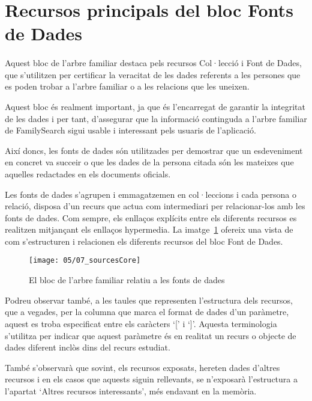\section{Recursos principals del bloc Fonts de Dades}

    \paragraph{}
    Aquest bloc de l'arbre familiar destaca pels recursos Col·lecció i Font de Dades, que s'utilitzen per certificar la veracitat de les dades referents a les persones que es poden trobar a l'arbre familiar o a les relacions que les uneixen.

    Aquest bloc és realment important, ja que és l'encarregat de garantir la integritat de les dades i per tant, d'assegurar que la informació continguda a l'arbre familiar de FamilySearch sigui usable i interessant pels usuaris de l'aplicació.

    Així doncs, les fonts de dades són utilitzades per demostrar que un esdeveniment en concret va succeir o que les dades de la persona citada són les mateixes que aquelles redactades en els documents oficials.

    Les fonts de dades s'agrupen i emmagatzemen en col·leccions i cada persona o relació, disposa d'un recurs que actua com intermediari per relacionar-los amb les fonts de dades. Com sempre, els enllaços explícits entre els diferents recursos es realitzen mitjançant els enllaços hypermedia. La imatge~\ref{img:sourcesBloc} ofereix una vista de com s'estructuren i relacionen els diferents recursos del bloc Font de Dades.

    \begin{figure}[h]
        \texttt{[image: 05/07\_sourcesCore]}
        \centering
        \caption{El bloc de l'arbre familiar relatiu a les fonts de dades}\label{img:sourcesBloc}
    \end{figure}

    Podreu observar també, a les taules que representen l'estructura dels recursos, que a vegades, per la columna que marca el format de dades d'un paràmetre, aquest es troba especificat entre els caràcters `[' i `]'. Aquesta terminologia s'utilitza per indicar que aquest paràmetre és en realitat un recurs o objecte de dades diferent inclòs dins del recurs estudiat.

    També s'observarà que sovint, els recursos exposats, hereten dades d'altres recursos i en els casos que aquests siguin rellevants, se n'exposarà l'estructura a l'apartat `Altres recursos interessants', més endavant en la memòria.

    
    
    
    
    
